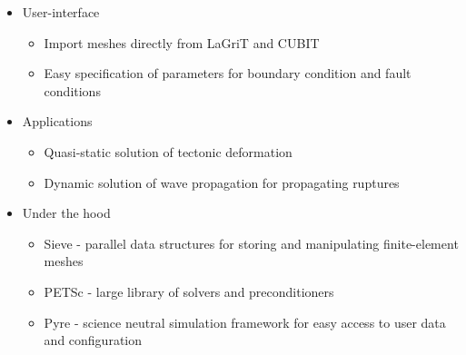 \documentclass[pdftex,cig,slideColor]{pp4slides}
\begin{document}
  \summary{}

  \begin{itemize}
  \item User-interface
    \begin{itemize}
    \item Import meshes directly from LaGriT and CUBIT
    \item Easy specification of parameters for boundary condition and
      fault conditions
    \end{itemize}
  \item Applications
    \begin{itemize}
    \item Quasi-static solution of tectonic deformation
    \item Dynamic solution of wave propagation for propagating ruptures
    \end{itemize}
  \item Under the hood
    \begin{itemize}
    \item Sieve - parallel data structures for storing and
      manipulating finite-element meshes
    \item PETSc - large library of solvers and preconditioners
    \item Pyre - science neutral simulation framework for easy access
      to user data and configuration
    \end{itemize}
  \end{itemize}

\end{document}
